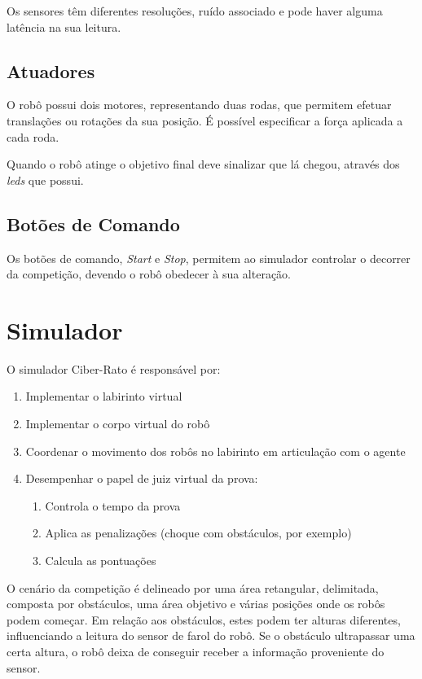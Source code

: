 \documentclass[citeauthoryear]{llncs} %
\begin{document}
Os sensores têm diferentes resoluções, ruído associado e pode haver alguma latência na sua leitura.

\subsection{Atuadores}

O robô possui dois motores, representando duas rodas, que permitem efetuar translações ou rotações da sua posição. É possível especificar a força aplicada a cada roda. 

Quando o robô atinge o objetivo final deve sinalizar que lá chegou, através dos \emph{leds} que possui. 

\subsection{Botões de Comando}
Os botões de comando, \emph{Start} e \emph{Stop}, permitem ao simulador controlar o decorrer da competição, devendo o robô obedecer à sua alteração.

\section{Simulador}

O simulador Ciber-Rato é responsável por:
\begin{enumerate} 
\item Implementar o labirinto virtual 
\item Implementar o corpo virtual do robô
\item Coordenar o movimento dos robôs no labirinto em articulação com o agente
\item Desempenhar o papel de juiz virtual da prova:
\begin{enumerate} 
\item Controla o tempo da prova
\item Aplica as penalizações (choque com obstáculos, por exemplo)
\item Calcula as pontuações
\end{enumerate}
\end{enumerate}

O cenário da competição é delineado por uma área retangular, delimitada, composta por obstáculos, uma área objetivo e várias posições onde os robôs podem começar. Em relação aos obstáculos, estes podem ter alturas diferentes, influenciando a leitura do sensor de farol do robô. Se o obstáculo ultrapassar uma certa altura, o robô deixa de conseguir receber a informação proveniente do sensor. 
\end{document}
